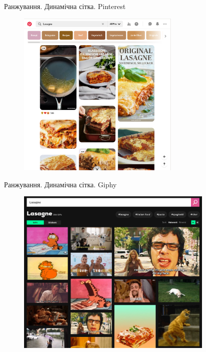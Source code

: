 \documentclass[10pt]{beamer}
\begin{document}
\begin{frame}{Ранжування. Динамічна сітка. Pinterest}
        \begin{center}
            \begin{figure}
            \includegraphics[height=8cm,natwidth=950,natheight=982]{images/search-results.Lasagne.pinterest.png}
            \end{figure}
        \end{center}
\end{frame}

\begin{frame}{Ранжування. Динамічна сітка. Giphy}
        \begin{center}
            \begin{figure}
            \includegraphics[height=8cm,natwidth=1071,natheight=911]{images/search-results.Lasagne.giphy.png}
            \end{figure}
        \end{center}
\end{frame}
\end{document}
